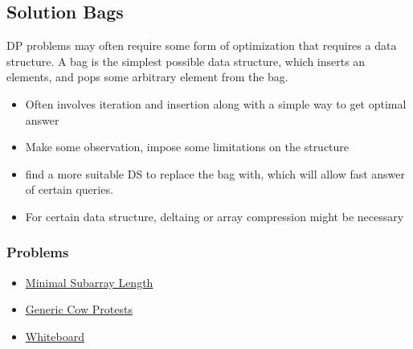 \subsection*{Solution Bags}
DP problems may often require some form of optimization that requires a data structure. A bag is the simplest possible data structure, which inserts an elements, and pops some arbitrary element from the bag.  
\begin{itemize}
	\item Often involves iteration and insertion along with a simple way to get optimal answer
	\item Make some observation, impose some limitations on the structure
	\item find a more suitable DS to replace the bag with, which will allow fast answer of certain queries.
	\item For certain data structure, deltaing or array compression might be necessary
\end{itemize}
\subsubsection*{Problems}
\begin{itemize}
	\item \href{https://vjudge.net/problem/UVA-12697}{Minimal Subarray Length}
	\item \href{https://vjudge.net/problem/EOlymp-2599}{Generic Cow Protests}
	\item \href{https://vjudge.net/problem/Kattis-whiteboard}{Whiteboard}
\end{itemize}	